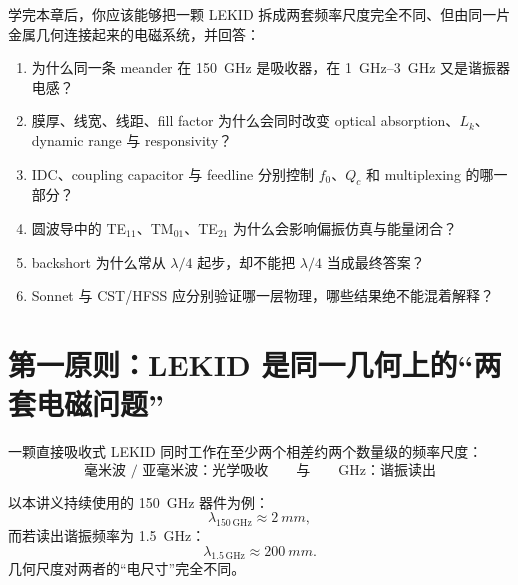 \documentclass[11pt,a4paper,openany]{ctexrep}
\begin{document}
\begin{goalbox}
学完本章后，你应该能够把一颗 LEKID 拆成两套频率尺度完全不同、但由同一片金属几何连接起来的电磁系统，并回答：
\begin{enumerate}
  \item 为什么同一条 meander 在 \SI{150}{GHz} 是吸收器，在 \SIrange{1}{3}{GHz} 又是谐振器电感？
  \item 膜厚、线宽、线距、fill factor 为什么会同时改变 optical absorption、$L_k$、dynamic range 与 responsivity？
  \item IDC、coupling capacitor 与 feedline 分别控制 $f_0$、$Q_c$ 和 multiplexing 的哪一部分？
  \item 圆波导中的 TE$_{11}$、TM$_{01}$、TE$_{21}$ 为什么会影响偏振仿真与能量闭合？
  \item backshort 为什么常从 $\lambda/4$ 起步，却不能把 $\lambda/4$ 当成最终答案？
  \item Sonnet 与 CST/HFSS 应分别验证哪一层物理，哪些结果绝不能混着解释？
\end{enumerate}
\end{goalbox}

\section{第一原则：LEKID 是同一几何上的“两套电磁问题”}

一颗直接吸收式 LEKID 同时工作在至少两个相差约两个数量级的频率尺度：
\[
\boxed{
\text{毫米波 / 亚毫米波：光学吸收}
\qquad\text{与}\qquad
\text{GHz：谐振读出}
}
\]

以本讲义持续使用的 \SI{150}{GHz} 器件为例：
\[
\lambda_{150\,\mathrm{GHz}}\approx \SI{2}{mm},
\]
而若读出谐振频率为 \SI{1.5}{GHz}：
\[
\lambda_{1.5\,\mathrm{GHz}}\approx \SI{200}{mm}.
\]
几何尺度对两者的“电尺寸”完全不同。

\begin{center}
\end{center}
\end{document}
